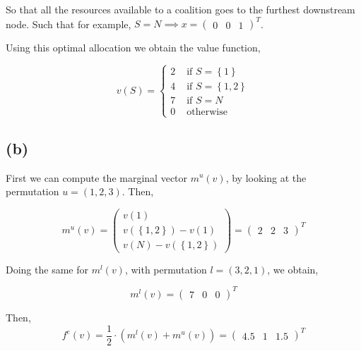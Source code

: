 \documentclass[american]{scrartcl}
\newcommand{\set}[1]{\left\{#1\right\}}
\begin{document}
So that all the resources available to a coalition goes to the furthest downstream node. Such that for example, $S = N \implies x = \begin{pmatrix} 0 & 0 & 1 \end{pmatrix}^T$.

Using this optimal allocation we obtain the value function,

\begin{equation}
    v(S) = \begin{cases}
        2 & \text{ if } S = \set{1}    \\
        4 & \text{ if } S = \set{1, 2} \\
        7 & \text{ if } S = N          \\
        0 & \text{ otherwise }
    \end{cases}
\end{equation}

\subsection*{(b)}

First we can compute the marginal vector $m^u(v)$, by looking at the permutation $u = (1, 2, 3)$. Then,

\begin{equation}
    m^u(v) = \begin{pmatrix}
        v(1)                 \\
        v(\set{1, 2}) - v(1) \\
        v(N) - v(\set{1, 2})
    \end{pmatrix} = \begin{pmatrix}
        2 &
        2 &
        3
    \end{pmatrix}^T
\end{equation}

Doing the same for $m^l(v)$, with permutation $l = (3, 2, 1)$, we obtain,

\begin{equation}
    m^l(v) =  \begin{pmatrix}
        7 &
        0 &
        0
    \end{pmatrix}^T
\end{equation}

Then, \begin{equation}
    f^e(v) = \frac{1}{2} \cdot (m^l(v) + m^u(v)) = \begin{pmatrix}
        4.5 & 1 & 1.5
    \end{pmatrix}^T
\end{equation}
\end{document}
